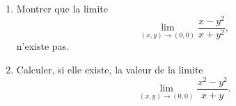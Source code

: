 \begin{exercice}\label{exoGeomAnal-0018}

  \begin{enumerate}
  \item Montrer que la limite 
    \begin{equation}
      \lim_{(x,y)\to(0,0)}\frac{x-y^2}{x+y^2},
    \end{equation}
    n'existe pas.
  \item Calculer, si elle existe, la valeur de la limite 
    \begin{equation}
      \lim_{(x,y)\to(0,0)}\frac{x^2-y^2}{x+y}.
    \end{equation}

  \end{enumerate}


\end{exercice}
